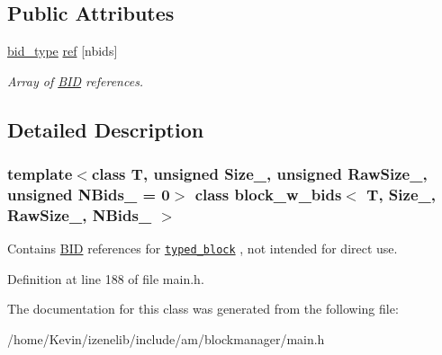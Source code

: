 \subsection*{Public Attributes}
\begin{CompactItemize}
\item 
\hypertarget{group__mnglayer_g4809f5f95e04ae33cec5ea5a5edd5db3}{
\hyperlink{structBID}{bid\_\-type} \hyperlink{group__mnglayer_g4809f5f95e04ae33cec5ea5a5edd5db3}{ref} \mbox{[}nbids\mbox{]}}
\label{group__mnglayer_g4809f5f95e04ae33cec5ea5a5edd5db3}

\begin{CompactList}\small\item\em Array of \hyperlink{structBID}{BID} references. \item\end{CompactList}\end{CompactItemize}


\subsection{Detailed Description}
\subsubsection*{template$<$class T, unsigned Size\_\-, unsigned RawSize\_\-, unsigned NBids\_\- = 0$>$ class block\_\-w\_\-bids$<$ T, Size\_\-, RawSize\_\-, NBids\_\- $>$}

Contains \hyperlink{structBID}{BID} references for {\tt \hyperlink{classtyped__block}{typed\_\-block}} , not intended for direct use. 

Definition at line 188 of file main.h.

The documentation for this class was generated from the following file:\begin{CompactItemize}
\item 
/home/Kevin/izenelib/include/am/blockmanager/main.h\end{CompactItemize}
